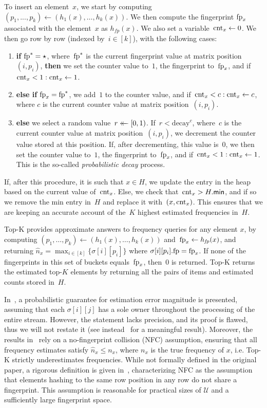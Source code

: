 To insert an element~$x$, we start by computing $(p_1,...,p_k) \gets (h_1(x),\ldots,h_k(x))$. We then compute the fingerprint $\textup{fp}_x$ associated with the element~$x$ as $h_\mathit{fp}(x)$. We also set a variable~$\textup{cnt}_x \gets 0$. We then go row by row (indexed by~$i \in [k]$), with the following cases:
\begin{enumerate}
    \item \textbf{if} $\textup{fp}^{*} = \star$, 
	where~$\textup{fp}^{*}$ is the current fingerprint value at matrix position~$(i,p_i)$, \textbf{then} we set the counter value to~$1$, the fingerprint to~$\textup{fp}_x$, and if~$\textup{cnt}_x < 1 : \textup{cnt}_x \gets 1$.
    \item \textbf{else if} $\textup{fp}_x = \textup{fp}^{*}$,
    we add~$1$ to the counter value, and if~$\textup{cnt}_x < c : \textup{cnt}_x \gets c$, where $c$ is the current counter value at matrix position~$(i,p_i)$. 
    \item \textbf{else}
    we select a random value~$r \mathrel{\leftarrow\mkern-14mu\leftarrow} [0,1)$. If~$r < \mathrm{decay}^{c}$, where~$c$ is the current counter value at matrix position~$(i,p_i)$, we decrement the counter value stored at this position. If, after decrementing, this value is~$0$, we then set the counter value to~$1$, the fingerprint to~$\textup{fp}_x$, and if~$\textup{cnt}_x < 1 : \textup{cnt}_x \gets 1$. This is the so-called \emph{probabilistic decay} process. 
\end{enumerate}

If, after this procedure, it is such that $x \in H$, we update the entry in the heap based on the current value of~$\textup{cnt}_x$. Else, we check that~$\textup{cnt}_x > H.\mathsf{min}$, and if so we remove the min entry in~$H$ and replace it with~$(x,\textup{cnt}_x)$. This ensures that we are keeping an accurate account of the~$K$ highest estimated frequencies in~$H$. 

Top-K provides approximate answers to frequency queries for any element $x$, by 
computing $(p_1,\ldots,p_k) \gets (h_1(x),\ldots,h_k(x))$ and~$\textup{fp}_x \gets h_\mathit{fp}(x)$, and returning $\hat{n}_x = \max_{i \in [k]} \{\sigma[i][p_i]\}$ where $\sigma[i][p_i].\textup{fp} = \textup{fp}_x$. %
If none of the fingerprints in this set of buckets equals~$\textup{fp}_x$, then~$0$ is returned. 
Top-K returns the estimated top-$K$ elements by returning all the pairs of items and estimated counts stored in~$H$. 


In~\cite{yang2019heavykeeper}, a probabilistic guarantee for estimation error magnitude is presented, assuming that each $\sigma[i][j]$ has a sole owner throughout the processing of the entire stream. However, the statement lacks precision, and its proof is flawed, thus we will not restate it (see instead~\cite{markelon23} for a meaningful result). Moreover, the results in~\cite{yang2019heavykeeper} rely on a no-fingerprint collision (NFC) assumption, ensuring that all frequency estimates satisfy $\hat{n}_x \leq n_{x}$, where $n_x$ is the true frequency of $x$, i.e. Top-K strictly underestimates frequencies. While not formally defined in the original paper, a rigorous definition is given in~\cite{markelon23}, characterizing NFC as the assumption that elements hashing to the same row position in any row do not share a fingerprint. This assumption is reasonable for practical sizes of $\mathcal{U}$ and a sufficiently large fingerprint space.

